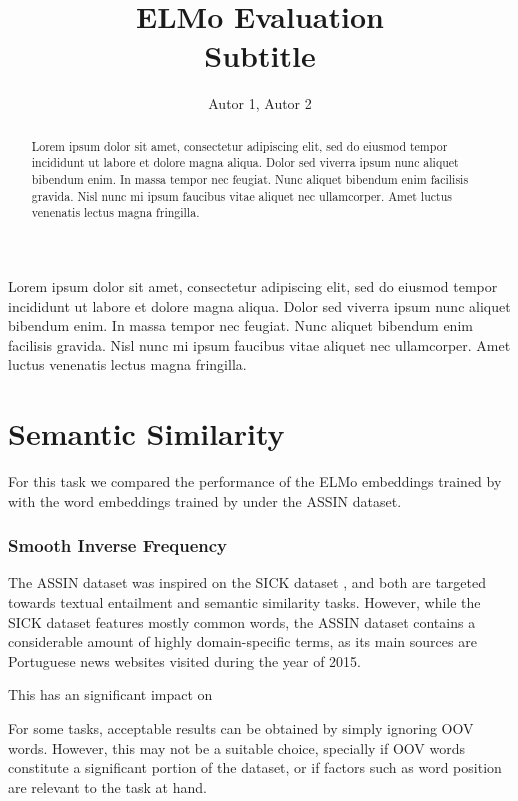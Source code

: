 \documentclass[12pt]{article}
\title{ELMo Evaluation\\ Subtitle}
\author{Autor 1\inst{1}, Autor 2\inst{2} }
\begin{document}
 

\maketitle

\begin{abstract}
  Lorem ipsum dolor sit amet, consectetur adipiscing elit, sed do eiusmod tempor incididunt ut labore et dolore magna aliqua. Dolor sed viverra ipsum nunc aliquet bibendum enim. In massa tempor nec feugiat. Nunc aliquet bibendum enim facilisis gravida. Nisl nunc mi ipsum faucibus vitae aliquet nec ullamcorper. Amet luctus venenatis lectus magna fringilla. 
\end{abstract}
     
\begin{resumo} 
  Lorem ipsum dolor sit amet, consectetur adipiscing elit, sed do eiusmod tempor incididunt ut labore et dolore magna aliqua. Dolor sed viverra ipsum nunc aliquet bibendum enim. In massa tempor nec feugiat. Nunc aliquet bibendum enim facilisis gravida. Nisl nunc mi ipsum faucibus vitae aliquet nec ullamcorper. Amet luctus venenatis lectus magna fringilla. 
\end{resumo}

\section{Semantic Similarity}


For this task we compared the performance of the ELMo embeddings trained by \cite{castro} with the word embeddings trained by \cite{hartmann2017portuguese} under the ASSIN dataset. 

\subsubsection{Smooth Inverse Frequency}

The ASSIN dataset was inspired on the SICK dataset \cite{assin}, and both are targeted towards textual entailment and semantic similarity tasks. However, while the SICK dataset features mostly common words, the ASSIN dataset contains a considerable amount of highly domain-specific terms, as its main sources are Portuguese news websites visited during the year of 2015.

This has an significant impact on 

For some tasks, acceptable results can be obtained by simply ignoring OOV words. However, this may not be a suitable choice, specially if OOV words constitute a significant portion of the dataset, or if factors such as word position are relevant to the task at hand.
\end{document}
